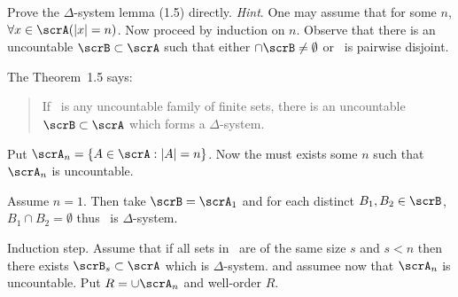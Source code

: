 \begin{enumerate}

\begin{excopy}
Prove the \(\Delta\)-system lemma (1.5) directly. 
\emph{Hint}. One may assume that for
some $n$, \(\forall x \in \scrA (|x| =n)\). 
Now proceed by induction on $n$. Observe that
there is an uncountable \(\scrB \subset \scrA\) such that either 
\(\cap \scrB \neq \emptyset\) or \scrB\ is pairwise
disjoint.
\end{excopy}

The Theorem~1.5 says:
\begin{quote}
If \scrA\ is any uncountable family of finite sets, there is an uncountable
\(\scrB \subset \scrA\) which forms a \(\Delta\)-system.
\end{quote}
Put \(\scrA_n = \{A \in \scrA: |A|=n\}\).
Now the must exists some $n$ such that \(\scrA_n\) is uncountable.

Assume \(n=1\). Then take \(\scrB = \scrA_1\) 
and for each distinct \(B_1,B_2 \in \scrB\), \(B_1\cap B_2 = \emptyset\)
thus \scrB\ is \(\Delta\)-system.

Induction step.
Assume that if all sets in \scrA\ are of the same size $s$ and \(s<n\)
then there exists \(\scrB_s\subset \scrA\) which is \(\Delta\)-system.
and assumee now that \(\scrA_n\) is uncountable.
Put \(R = \cup \scrA_n\) and well-order $R$.

\unfinished


\end{enumerate}
